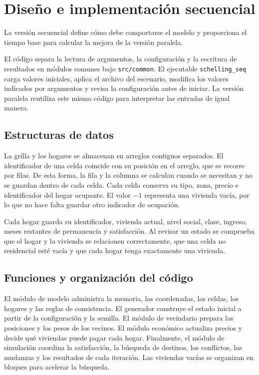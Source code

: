 \section{Diseño e implementación secuencial}

La versión secuencial define cómo debe comportarse el modelo y proporciona el tiempo base para calcular la mejora de la versión paralela.

El código separa la lectura de argumentos, la configuración y la escritura de resultados en módulos comunes bajo \texttt{src/common}. El ejecutable \texttt{schelling\_seq} carga valores iniciales, aplica el archivo del escenario, modifica los valores indicados por argumentos y revisa la configuración antes de iniciar. La versión paralela reutiliza este mismo código para interpretar las entradas de igual manera.

\subsection{Estructuras de datos}

La grilla y los hogares se almacenan en arreglos contiguos separados. El identificador de una celda coincide con su posición en el arreglo, que se recorre por filas. De esta forma, la fila y la columna se calculan cuando se necesitan y no se guardan dentro de cada celda. Cada celda conserva su tipo, zona, precio e identificador del hogar ocupante. El valor $-1$ representa una vivienda vacía, por lo que no hace falta guardar otro indicador de ocupación.

Cada hogar guarda su identificador, vivienda actual, nivel social, clase, ingreso, meses restantes de permanencia y satisfacción. Al revisar un estado se comprueba que el hogar y la vivienda se relacionen correctamente, que una celda no residencial esté vacía y que cada hogar tenga exactamente una vivienda.

\subsection{Funciones y organización del código}

El módulo de modelo administra la memoria, las coordenadas, las celdas, los hogares y las reglas de consistencia. El generador construye el estado inicial a partir de la configuración y la semilla. El módulo de vecindario prepara las posiciones y los pesos de los vecinos. El módulo económico actualiza precios y decide qué viviendas puede pagar cada hogar. Finalmente, el módulo de simulación coordina la satisfacción, la búsqueda de destinos, los conflictos, las mudanzas y los resultados de cada iteración. Las viviendas vacías se organizan en bloques para acelerar la búsqueda.

